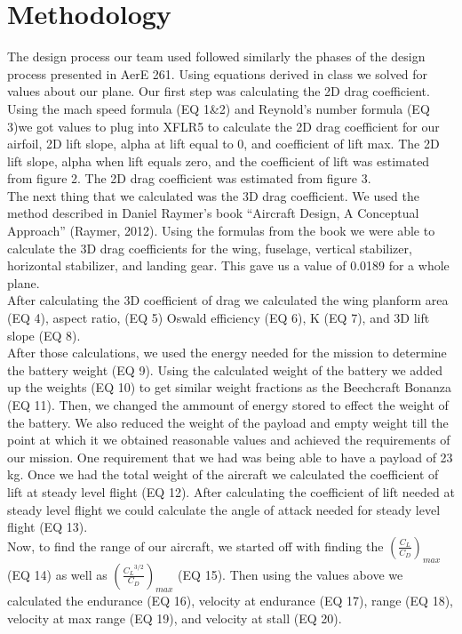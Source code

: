 \documentclass[12pt,A4paper]{article}
\begin{document}
	\clearpage
	\section{Methodology}
	\hspace{.15 in}The design process our team used followed similarly the phases of the design process presented in AerE 261. Using equations derived in class we solved for values about our plane. Our first step was calculating the 2D drag coefficient. Using the mach speed formula (EQ 1\&2) and Reynold's number formula (EQ 3)we got values to plug into XFLR5 to calculate the 2D drag coefficient for our airfoil, 2D lift slope, alpha at lift equal to 0, and coefficient of lift max. The 2D lift slope, alpha when lift equals zero, and the coefficient of lift was estimated from figure 2. The 2D drag coefficient was estimated from figure 3. \\
	\indent The next thing that we calculated was the 3D drag coefficient. We used the method described in Daniel Raymer's book “Aircraft Design, A Conceptual Approach” (Raymer, 2012). Using the formulas from the book we were able to calculate the 3D drag coefficients for the wing, fuselage, vertical stabilizer, horizontal stabilizer, and landing gear. This gave us a value of 0.0189 for a whole plane. \\
	\indent After calculating the 3D coefficient of drag we calculated the wing planform area (EQ 4), aspect ratio, (EQ 5) Oswald efficiency (EQ 6), K (EQ 7), and 3D lift slope (EQ 8).\\
	\indent After those calculations, we used the energy needed for the mission to determine the battery weight (EQ 9). Using the calculated weight of the battery we added up the weights (EQ 10) to get similar weight fractions as the Beechcraft Bonanza (EQ 11). Then, we changed the ammount of energy stored to effect the weight of the battery. We also reduced the weight of the payload and empty weight till the point at which it we obtained reasonable values and achieved the requirements of our mission. One requirement that we had was being able to have a payload of 23 kg. Once we had the total weight of the aircraft we calculated the coefficient of lift at steady level flight (EQ 12). After calculating the coefficient of lift needed at steady level flight we could calculate the angle of attack needed for steady level flight (EQ 13). \\
	\indent Now, to find the range of our aircraft, we started off with finding the $(\frac{C_L}{C_D})_{max}$ (EQ 14) as well as $(\frac{{C_L}^{3/2}}{C_D})_{max}$ (EQ 15). Then using the values above we calculated the endurance (EQ 16), velocity at endurance (EQ 17), range (EQ 18), velocity at max range (EQ 19), and velocity at stall (EQ 20). \\
\end{document}
